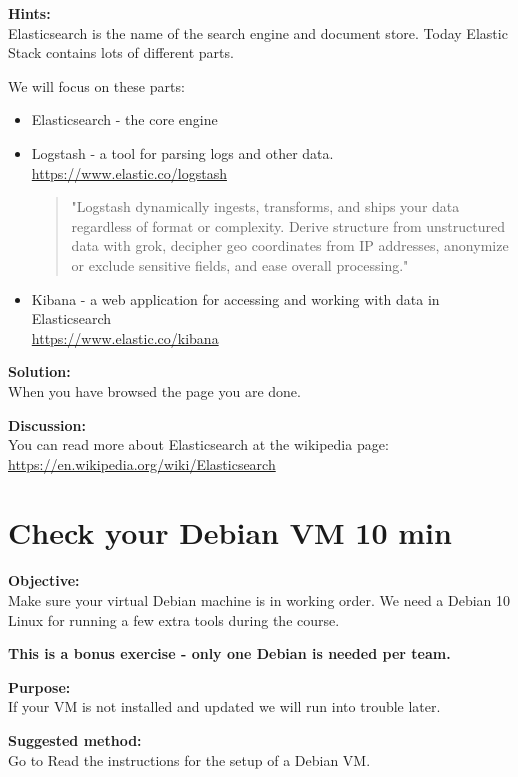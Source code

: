 \documentclass[a4paper,11pt,notitlepage]{report}
\begin{document}
{\bf Hints:}\\
Elasticsearch is the name of the search engine and document store. Today Elastic Stack contains lots of different parts.

We will focus on these parts:
\begin{itemize}
\item Elasticsearch - the core engine
\item Logstash - a tool for parsing logs and other data.\\
\url{https://www.elastic.co/logstash}
\begin{quote}
"Logstash dynamically ingests, transforms, and ships your data regardless of format or complexity. Derive structure from unstructured data with grok, decipher geo coordinates from IP addresses, anonymize or exclude sensitive fields, and ease overall processing."
\end{quote}
\item Kibana - a web application for accessing and working with data in Elasticsearch\\
\url{https://www.elastic.co/kibana}
\end{itemize}

{\bf Solution:}\\
When you have browsed the page you are done.

{\bf Discussion:}\\
You can read more about Elasticsearch at the wikipedia page:\\
\url{https://en.wikipedia.org/wiki/Elasticsearch}

\chapter{Check your Debian VM 10 min}
\label{ex:basicDebianVM}


{\bf Objective:}\\
Make sure your virtual Debian machine is in working order.
We need a Debian 10 Linux for running a few extra tools during the course.

{\Large \bf This is a bonus exercise - only one Debian is needed per team.}

{\bf Purpose:}\\
If your VM is not installed and updated we will run into trouble later.

{\bf Suggested method:}\\
Go to  Read the instructions for the setup of a Debian VM.
\end{document}

